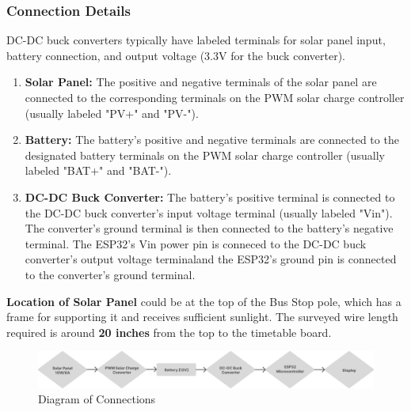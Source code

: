 \documentclass[12pt]{article} %
\begin{document}
\subsubsection{Connection Details}
DC-DC buck converters typically have labeled terminals for solar panel input, battery connection, and output voltage (3.3V for the buck converter).
\begin{enumerate}
    \item \textbf{Solar Panel:} The positive and negative terminals of the solar panel are connected to the corresponding terminals on the \acrshort{PWM} solar charge controller (usually labeled "PV+" and "PV-").
    \item \textbf{Battery:} The battery's positive and negative terminals are connected to the designated battery terminals on the \acrshort{PWM} solar charge controller (usually labeled "BAT+" and "BAT-").
    \item \textbf{DC-DC Buck Converter:} The battery's positive terminal is connected to the DC-DC buck converter's input voltage terminal (usually labeled "Vin"). The converter's ground terminal is then connected to the battery's negative terminal. The ESP32's Vin power pin is conneced to the DC-DC buck converter's output voltage terminaland the ESP32's ground pin is connected to the converter's ground terminal.
\end{enumerate}
\textbf{Location of Solar Panel} could be at the top of the Bus Stop pole, which has a frame for supporting it and receives sufficient sunlight.
The surveyed wire length required is around \textbf{20 inches} from the top to the timetable board. 

\begin{figure}[H]
    \centering
    \includegraphics[width=1\textwidth]{Group 462.png}
    \caption{Diagram of Connections}
    \label{fig:enter-label}
\end{figure}
\end{document}
